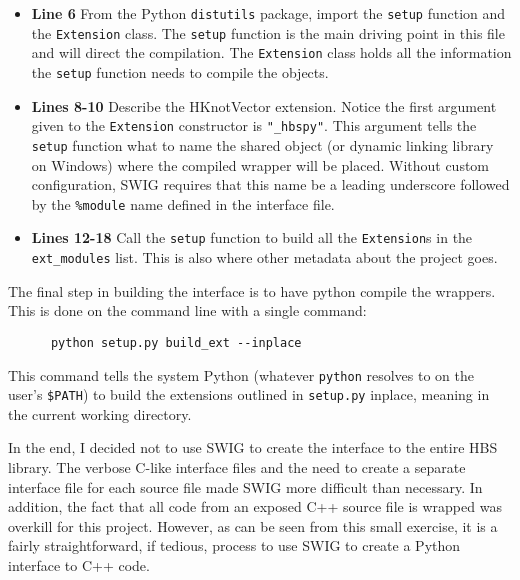     \begin{itemize}
      \item \textbf{Line 6} From the Python  \texttt{distutils} package, import the \texttt{setup} function and the \texttt{Extension} class. The \texttt{setup} function is the main driving point in this file and will direct the compilation. The \texttt{Extension} class holds all the information the \texttt{setup} function needs to compile the objects.
      \item \textbf{Lines 8-10} Describe the HKnotVector extension. Notice the first argument given to the \texttt{Extension} constructor is \texttt{"\_hbspy"}. This argument tells the \texttt{setup} function what to name the shared object (or dynamic linking library on Windows) where the compiled wrapper will be placed. Without custom configuration, SWIG requires that this name be a leading underscore followed by the \texttt{\%module} name defined in the interface file.
      \item \textbf{Lines 12-18} Call the \texttt{setup} function to build all the \texttt{Extension}s in the \texttt{ext\_modules} list. This is also where other metadata about the project goes.
    \end{itemize}
    \mainstretch{}

    \noindent The final step in building the interface is to have python compile the wrappers. This is done on the command line with a single command:

    \vspace{.2in}
    \begin{lstlisting}
      python setup.py build_ext --inplace
    \end{lstlisting}
    \mainstretch{}

    \noindent This command tells the system Python (whatever \texttt{python} resolves to on the user's \texttt{\$PATH}) to build the extensions outlined in \texttt{setup.py} inplace, meaning in the current working directory.

    In the end, I decided not to use SWIG to create the interface to the entire HBS library. The verbose C-like interface files and the need to create a separate interface file for each source file made SWIG more difficult than necessary. In addition, the fact that all code from an exposed C++ source file is wrapped was overkill for this project. However, as can be seen from this small exercise, it is a fairly straightforward, if tedious, process to use SWIG to create a Python interface to C++ code.  

